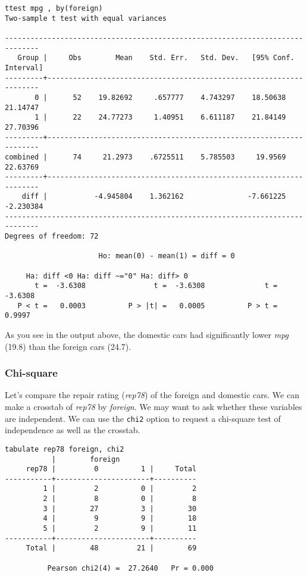 \begin{lstlisting}
ttest mpg , by(foreign)
Two-sample t test with equal variances

------------------------------------------------------------------------------
   Group |     Obs        Mean    Std. Err.   Std. Dev.   [95% Conf. Interval]
---------+--------------------------------------------------------------------
       0 |      52    19.82692     .657777    4.743297    18.50638    21.14747
       1 |      22    24.77273     1.40951    6.611187    21.84149    27.70396
---------+--------------------------------------------------------------------
combined |      74     21.2973    .6725511    5.785503     19.9569    22.63769
---------+--------------------------------------------------------------------
    diff |           -4.945804    1.362162               -7.661225   -2.230384
------------------------------------------------------------------------------
Degrees of freedom: 72

                      Ho: mean(0) - mean(1) = diff = 0

     Ha: diff <0 Ha: diff ~="0" Ha: diff> 0
       t =  -3.6308                t =  -3.6308              t =  -3.6308
   P < t =   0.0003          P > |t| =   0.0005          P > t =   0.9997
\end{lstlisting}

As you see in the output above, the domestic cars had significantly lower \textit{mpg} (19.8) than the foreign cars (24.7).

\subsubsection{Chi-square}

Let's compare the repair rating (\textit{rep78}) of the foreign and domestic cars. We can make a crosstab of \textit{rep78} by \textit{foreign}. We may want to ask whether these variables are independent. We can use the \lstinline{chi2} option to request a chi-square test of independence as well as the crosstab.

\begin{lstlisting}
tabulate rep78 foreign, chi2
           |        foreign
     rep78 |         0          1 |     Total
-----------+----------------------+----------
         1 |         2          0 |         2
         2 |         8          0 |         8
         3 |        27          3 |        30
         4 |         9          9 |        18
         5 |         2          9 |        11
-----------+----------------------+----------
     Total |        48         21 |        69

          Pearson chi2(4) =  27.2640   Pr = 0.000
\end{lstlisting}

